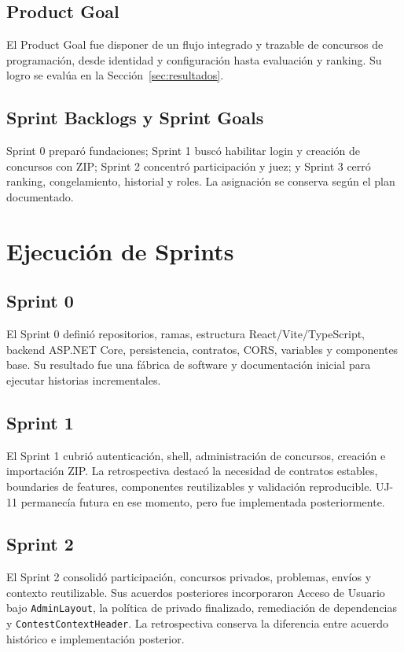 \documentclass[11pt,a4paper]{article}
\begin{document}
\subsection{Product Goal}
El Product Goal fue disponer de un flujo integrado y trazable de concursos de programación, desde identidad y configuración hasta evaluación y ranking. Su logro se evalúa en la Sección~\ref{sec:resultados}.

\subsection{Sprint Backlogs y Sprint Goals}
Sprint 0 preparó fundaciones; Sprint 1 buscó habilitar login y creación de concursos con ZIP; Sprint 2 concentró participación y juez; y Sprint 3 cerró ranking, congelamiento, historial y roles. La asignación se conserva según el plan documentado.

\section{Ejecución de Sprints}

\subsection{Sprint 0}
El Sprint 0 definió repositorios, ramas, estructura React/Vite/TypeScript, backend ASP.NET Core, persistencia, contratos, CORS, variables y componentes base. Su resultado fue una fábrica de software y documentación inicial para ejecutar historias incrementales.

\subsection{Sprint 1}
El Sprint 1 cubrió autenticación, shell, administración de concursos, creación e importación ZIP. La retrospectiva destacó la necesidad de contratos estables, boundaries de features, componentes reutilizables y validación reproducible. UJ-11 permanecía futura en ese momento, pero fue implementada posteriormente.

\subsection{Sprint 2}
El Sprint 2 consolidó participación, concursos privados, problemas, envíos y contexto reutilizable. Sus acuerdos posteriores incorporaron Acceso de Usuario bajo \texttt{AdminLayout}, la política de privado finalizado, remediación de dependencias y \texttt{ContestContextHeader}. La retrospectiva conserva la diferencia entre acuerdo histórico e implementación posterior.
\end{document}
